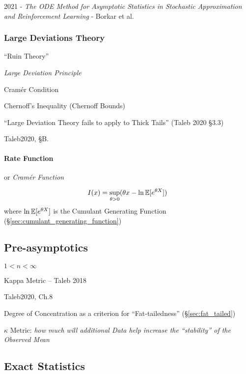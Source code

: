 2021 - \emph{The ODE Method for Asymptotic Statistics in Stochastic
Approximation and Reinforcement Learning} - Borkar et al.



\subsubsection{Large Deviations Theory}\label{sec:large_deviations_theory}

``Ruin Theory''

\emph{Large Deviation Principle}

Cram\'er Condition

Chernoff's Inequality (Chernoff Bounds)

``Large Deviation Theory fails to apply to Thick Tails'' (Taleb 2020 \S 3.3)

Taleb2020, \S B.



\paragraph{Rate Function}\label{sec:rate_function}\hfill

or \emph{Cram\'er Function}

\[
  I(x) = \sup_{\theta > 0} (\theta x - \ln \mathbb{E}[e^{\theta X}])
\]
where $\ln \mathbb{E}[e^{\theta X}]$ is the Cumulant Generating Function
(\S\ref{sec:cumulant_generating_function})



\subsection{Pre-asymptotics}\label{sec:preasymptotics}


$1 < n < \infty$

Kappa Metric -- Taleb 2018

Taleb2020, Ch.8

Degree of Concentration as a criterion for ``Fat-tailedness''
(\S\ref{sec:fat_tailed})

$\kappa$ Metric: \emph{how much will additional Data help increase the
``stability'' of the Observed Mean}



\subsection{Exact Statistics}\label{sec:exact_statistics}

